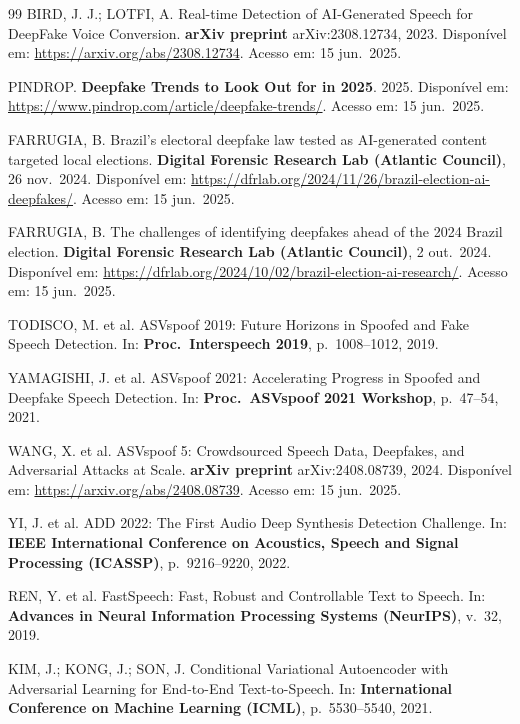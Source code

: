 \documentclass[12pt,a4paper]{article}
\begin{document}
\begin{thebibliography}{99}
	BIRD, J. J.; LOTFI, A.
	Real-time Detection of AI-Generated Speech for DeepFake Voice Conversion.
	\textbf{arXiv preprint} arXiv:2308.12734, 2023.
	Disponível em: \url{https://arxiv.org/abs/2308.12734}.
	Acesso em: 15 jun.\ 2025.
	
	PINDROP.
	\textbf{Deepfake Trends to Look Out for in 2025}.
	2025.
	Disponível em: \url{https://www.pindrop.com/article/deepfake-trends/}.
	Acesso em: 15 jun.\ 2025.
	
	FARRUGIA, B.
	Brazil's electoral deepfake law tested as AI-generated content targeted local
	elections.
	\textbf{Digital Forensic Research Lab (Atlantic Council)}, 26 nov.\ 2024.
	Disponível em:
	\url{https://dfrlab.org/2024/11/26/brazil-election-ai-deepfakes/}.
	Acesso em: 15 jun.\ 2025.
	
	FARRUGIA, B.
	The challenges of identifying deepfakes ahead of the 2024 Brazil election.
	\textbf{Digital Forensic Research Lab (Atlantic Council)}, 2 out.\ 2024.
	Disponível em: \url{https://dfrlab.org/2024/10/02/brazil-election-ai-research/}.
	Acesso em: 15 jun.\ 2025.
	
	TODISCO, M. et al.
	ASVspoof 2019: Future Horizons in Spoofed and Fake Speech Detection.
	In: \textbf{Proc.\ Interspeech 2019}, p.~1008--1012, 2019.
	
	YAMAGISHI, J. et al.
	ASVspoof 2021: Accelerating Progress in Spoofed and Deepfake Speech Detection.
	In: \textbf{Proc.\ ASVspoof 2021 Workshop}, p.~47--54, 2021.
	
	WANG, X. et al.
	ASVspoof 5: Crowdsourced Speech Data, Deepfakes, and Adversarial Attacks at
	Scale.
	\textbf{arXiv preprint} arXiv:2408.08739, 2024.
	Disponível em: \url{https://arxiv.org/abs/2408.08739}.
	Acesso em: 15 jun.\ 2025.
	
	YI, J. et al.
	ADD 2022: The First Audio Deep Synthesis Detection Challenge.
	In: \textbf{IEEE International Conference on Acoustics, Speech and Signal
		Processing (ICASSP)}, p.~9216--9220, 2022.
	
	REN, Y. et al.
	FastSpeech: Fast, Robust and Controllable Text to Speech.
	In: \textbf{Advances in Neural Information Processing Systems (NeurIPS)},
	v.~32, 2019.
	
	KIM, J.; KONG, J.; SON, J.
	Conditional Variational Autoencoder with Adversarial Learning for End-to-End
	Text-to-Speech.
	In: \textbf{International Conference on Machine Learning (ICML)},
	p.~5530--5540, 2021.
	

\end{thebibliography}
\end{document}
